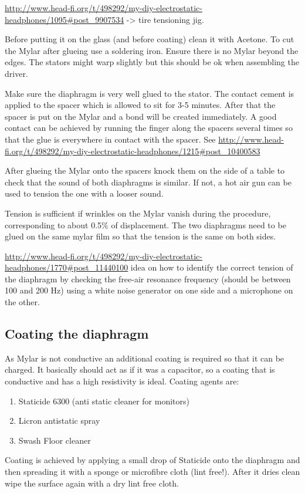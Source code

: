 \documentclass{article}
\begin{document}
\url{http://www.head-fi.org/t/498292/my-diy-electrostatic-headphones/1095#post_9907534} -> tire tensioning jig.

Before putting it on the glass (and before coating) clean it with Acetone. To cut the Mylar after glueing use a soldering iron. Ensure there is no Mylar beyond the edges. The stators might warp slightly but this should be ok when assembling the driver.

Make sure the diaphragm is very well glued to the stator. The contact cement is applied to the spacer which is allowed to sit for 3-5 minutes. After that the spacer is put on the Mylar and a bond will be created immediately. A good contact can be achieved by running the finger along the spacers several times so that the glue is everywhere in contact with the spacer. See \url{http://www.head-fi.org/t/498292/my-diy-electrostatic-headphones/1215#post_10400583}

After glueing the Mylar onto the spacers knock them on the side of a table to check that the sound of both diaphragms is similar. If not, a hot air gun can be used to tension the one with a looser sound.

Tension is sufficient if wrinkles on the Mylar vanish during the procedure, corresponding to about 0.5\% of displacement. The two diaphragms need to be glued on the same mylar film so that the tension is the same on both sides.

\url{http://www.head-fi.org/t/498292/my-diy-electrostatic-headphones/1770#post_11440100} idea on how to identify the correct tension of the diaphragm by checking the free-air resonance frequency (should be between 100 and 200 Hz) using a white noise generator on one side and a microphone on the other.

\subsection{Coating the diaphragm}
As Mylar is not conductive an additional coating is required so that it can be charged. It basically should act as if it was a capacitor, so a coating that is conductive and has a high resistivity is ideal. Coating agents are:
\begin{enumerate}
    \item Staticide 6300 (anti static cleaner for monitors)
    \item Licron antistatic spray
    \item Swash Floor cleaner
\end{enumerate}
Coating is achieved by applying a small drop of Staticide onto the diaphragm and then spreading it with a sponge or microfibre cloth (lint free!). After it dries clean wipe the surface again with a dry lint free cloth.
\end{document}

